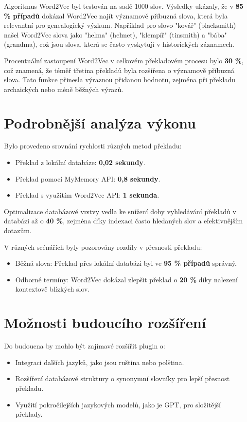 \documentclass[czech, ba, kiv, he]{fasthesis}
\begin{document}
Algoritmus Word2Vec byl testován na sadě 1000 slov. Výsledky ukázaly, že v \textbf{85 \% případů} dokázal Word2Vec najít významově příbuzná slova, která byla relevantní pro genealogický výzkum. Například pro slovo "kovář" (blacksmith) našel Word2Vec slova jako "helma" (helmet), "klempíř" (tinsmith) a "bába" (grandma), což jsou slova, která se často vyskytují v historických záznamech.

Procentuální zastoupení Word2Vec v celkovém překladovém procesu bylo \textbf{30 \%}, což znamená, že téměř třetina překladů byla rozšířena o významově příbuzná slova. Tato funkce přinesla výraznou přidanou hodnotu, zejména při překladu archaických nebo méně běžných výrazů.

\section{Podrobnější analýza výkonu}
Bylo provedeno srovnání rychlosti různých metod překladu:
\begin{itemize}
    \item Překlad z lokální databáze: \textbf{0,02 sekundy}.
    \item Překlad pomocí MyMemory API: \textbf{0,8 sekundy}.
    \item Překlad s využitím Word2Vec API: \textbf{1 sekunda}.
\end{itemize}
Optimalizace databázové vrstvy vedla ke snížení doby vyhledávání překladů v databázi až o \textbf{40 \%}, zejména díky indexaci často hledaných slov a efektivnějším dotazům.

V různých scénářích byly pozorovány rozdíly v přesnosti překladu:
\begin{itemize}
    \item Běžná slova: Překlad přes lokální databázi byl ve \textbf{95 \% případů} správný.
    \item Odborné termíny: Word2Vec dokázal zlepšit překlad o \textbf{20 \%} díky nalezení kontextově blízkých slov.
\end{itemize}

\section{Možnosti budoucího rozšíření}
Do budoucna by mohlo být zajímavé rozšířit plugin o:
\begin{itemize}
    \item Integraci dalších jazyků, jako jsou ruština nebo polština.
    \item Rozšíření databázové struktury o synonymní slovníky pro lepší přesnost překladu.
    \item Využití pokročilejších jazykových modelů, jako je GPT, pro složitější překlady.
\end{itemize}
\end{document}
